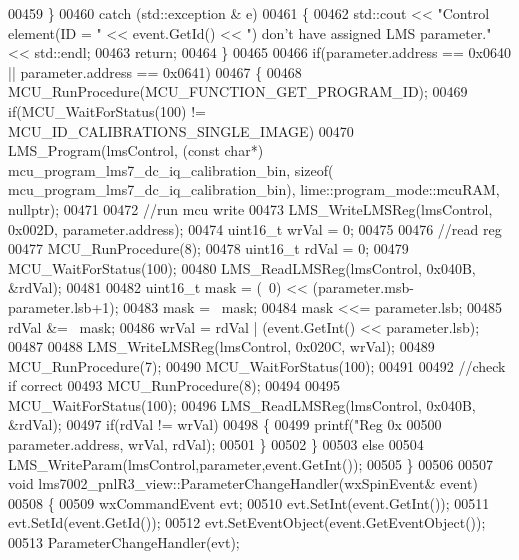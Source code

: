 \begin{DoxyCode}
{{{{00459     \}
00460     \textcolor{keywordflow}{catch} (std::exception & e)
00461     \{
00462         std::cout << \textcolor{stringliteral}{"Control element(ID = "} << \textcolor{keyword}{event}.GetId() << \textcolor{stringliteral}{") don't have assigned LMS parameter."} << 
      std::endl;
00463         \textcolor{keywordflow}{return};
00464     \}
00465 
00466     \textcolor{keywordflow}{if}(parameter.address == 0x0640 || parameter.address == 0x0641)
00467     \{
00468         MCU_RunProcedure(MCU_FUNCTION_GET_PROGRAM_ID);
00469         \textcolor{keywordflow}{if}(MCU_WaitForStatus(100) != MCU_ID_CALIBRATIONS_SINGLE_IMAGE)
00470             LMS_Program(lmsControl, (\textcolor{keyword}{const} \textcolor{keywordtype}{char}*)
      mcu_program_lms7_dc_iq_calibration_bin, \textcolor{keyword}{sizeof}(
      mcu_program_lms7_dc_iq_calibration_bin), lime::program_mode::mcuRAM, \textcolor{keyword}{nullptr});
00471 
00472         \textcolor{comment}{//run mcu write}
00473         LMS_WriteLMSReg(lmsControl, 0x002D, parameter.address);
00474         uint16\_t wrVal = 0;
00475 
00476         \textcolor{comment}{//read reg}
00477         MCU_RunProcedure(8);
00478         uint16\_t rdVal = 0;
00479         MCU_WaitForStatus(100);
00480         LMS_ReadLMSReg(lmsControl, 0x040B, &rdVal);
00481 
00482         uint16\_t mask = (~0) << (parameter.msb-parameter.lsb+1);
00483         mask = ~mask;
00484         mask <<= parameter.lsb;
00485         rdVal &= ~mask;
00486         wrVal = rdVal | (\textcolor{keyword}{event}.GetInt() << parameter.lsb);
00487 
00488         LMS_WriteLMSReg(lmsControl, 0x020C, wrVal);
00489         MCU_RunProcedure(7);
00490         MCU_WaitForStatus(100);
00491 
00492         \textcolor{comment}{//check if correct}
00493         MCU_RunProcedure(8);
00494 
00495         MCU_WaitForStatus(100);
00496         LMS_ReadLMSReg(lmsControl, 0x040B, &rdVal);
00497         \textcolor{keywordflow}{if}(rdVal != wrVal)
00498         \{
00499             printf(\textcolor{stringliteral}{"Reg 0x%
00500                    parameter.address, wrVal, rdVal);
00501         \}
00502     \}
00503     \textcolor{keywordflow}{else}
00504         LMS_WriteParam(lmsControl,parameter,event.GetInt());
00505 \}
00506 
00507 \textcolor{keywordtype}{void} lms7002_pnlR3_view::ParameterChangeHandler(wxSpinEvent& event)
00508 \{
00509     wxCommandEvent evt;
00510     evt.SetInt(event.GetInt());
00511     evt.SetId(event.GetId());
00512     evt.SetEventObject(event.GetEventObject());
00513     ParameterChangeHandler(evt);
}}}}}
\end{DoxyCode}
